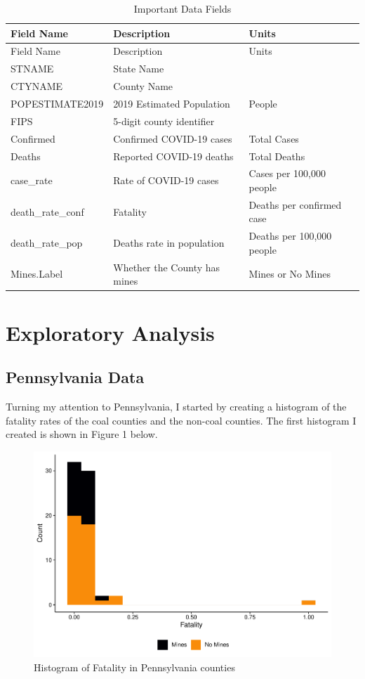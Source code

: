 \documentclass[
  12pt,
]{article}
\begin{document}
\begin{longtable}[]{@{}lll@{}}
\caption{Important Data Fields}\tabularnewline
\toprule
Field Name & Description & Units\tabularnewline
\midrule
\endfirsthead
\toprule
Field Name & Description & Units\tabularnewline
\midrule
\endhead
STNAME & State Name &\tabularnewline
CTYNAME & County Name &\tabularnewline
POPESTIMATE2019 & 2019 Estimated Population & People\tabularnewline
FIPS & 5-digit county identifier &\tabularnewline
Confirmed & Confirmed COVID-19 cases & Total Cases\tabularnewline
Deaths & Reported COVID-19 deaths & Total Deaths\tabularnewline
case\_rate & Rate of COVID-19 cases & Cases per 100,000
people\tabularnewline
death\_rate\_conf & Fatality & Deaths per confirmed case\tabularnewline
death\_rate\_pop & Deaths rate in population & Deaths per 100,000
people\tabularnewline
Mines.Label & Whether the County has mines & Mines or No
Mines\tabularnewline
\bottomrule
\end{longtable}

\newpage

\hypertarget{exploratory-analysis}{%
\section{Exploratory Analysis}\label{exploratory-analysis}}

\hypertarget{pennsylvania-data}{%
\subsection{Pennsylvania Data}\label{pennsylvania-data}}

Turning my attention to Pennsylvania, I started by creating a histogram
of the fatality rates of the coal counties and the non-coal counties.
The first histogram I created is shown in Figure 1 below.

\begin{figure}
\centering
\includegraphics{Hancock_ENV872_Project_files/figure-latex/PA Histogram1-1.pdf}
\caption{Histogram of Fatality in Pennsylvania counties}
\end{figure}
\end{document}
